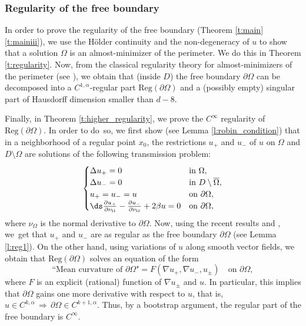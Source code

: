 \subsubsection{Regularity of the free boundary} In order to prove the regularity of the free boundary (Theorem \ref{t:main}\eqref{t:mainiii}), we use the Hölder continuity and the non-degeneracy of $u$ to show that a solution $\Omega$ is an almost-minimizer of the perimeter. We do this in Theorem \ref{t:regularity}. Now, from the classical regularity theory for almost-minimizers of the perimeter (see \cite{tamanini}), we obtain that (inside $D$) the free boundary $\partial\Omega$ can be decomposed into a $C^{1,\alpha}$-regular part $\text{Reg}(\partial\Omega)$ and a (possibly empty) singular part of Hausdorff dimension smaller than $d-8$.

Finally, in Theorem \ref{t:higher_regularity}, we prove the $C^\infty$ regularity of $\text{Reg}(\partial\Omega)$. In order to do~so, we first show (see Lemma \ref{l:robin_condition}) that in a neighborhood of a regular point $x_0$, the restrictions $u_+$ and $u_-$ of $u$ on $\Omega$ and $D\setminus\Omega$ are solutions of the following transmission problem:
\[\begin{cases}
\Delta u_+=0&\text{in } \Omega,\\
\Delta u_-=0&\text{in } D\setminus\overline\Omega,\\
u_+=u_-=u&\text{on }\partial\Omega,\\
\ds\frac{\partial u_+}{\partial \nu_\Omega}-\frac{\partial u_-}{\partial \nu_\Omega}+2\beta u=0&\text{on } \partial\Omega,
\end{cases}\]
where $\nu_\Omega$ is the normal derivative to $\partial\Omega$. Now, using the recent results \cite{css} and \cite{D}, we~get that $u_+$ and $u_-$ are as regular as the free boundary $\partial\Omega$ (see Lemma \ref{l:reg1}). On the other hand, using variations of $u$ along smooth vector fields, we obtain that $\text{Reg}(\partial\Omega)$ solves an equation of the form
\[\text{``Mean curvature of $\partial\Omega$"}=F(\nabla u_+,\nabla u_-,u_\pm)\quad\text{on } \partial\Omega,\]
where $F$ is an explicit (rational) function of $\nabla u_\pm$ and $u$.
In particular, this implies that $\partial\Omega$ gains one more derivative with respect to $u$, that is, $u\in C^{k,\alpha}\,\Rightarrow\,\partial\Omega\in C^{k+1,\alpha}$. Thus, by a bootstrap argument, the regular part of the free boundary is $C^\infty$.

